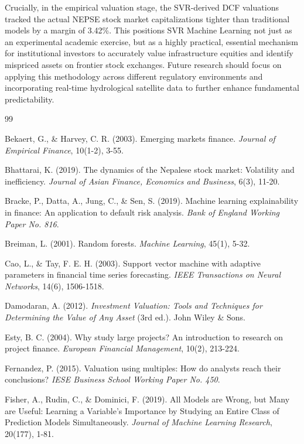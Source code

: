 \documentclass[11pt,a4paper]{article}
\begin{document}
Crucially, in the empirical valuation stage, the SVR-derived DCF valuations tracked the actual NEPSE stock market capitalizations tighter than traditional models by a margin of 3.42\%. This positions SVR Machine Learning not just as an experimental academic exercise, but as a highly practical, essential mechanism for institutional investors to accurately value infrastructure equities and identify mispriced assets on frontier stock exchanges. Future research should focus on applying this methodology across different regulatory environments and incorporating real-time hydrological satellite data to further enhance fundamental predictability.

\begin{thebibliography}{99}

Bekaert, G., \& Harvey, C. R. (2003). Emerging markets finance. \textit{Journal of Empirical Finance}, 10(1-2), 3-55.

Bhattarai, K. (2019). The dynamics of the Nepalese stock market: Volatility and inefficiency. \textit{Journal of Asian Finance, Economics and Business}, 6(3), 11-20.

Bracke, P., Datta, A., Jung, C., \& Sen, S. (2019). Machine learning explainability in finance: An application to default risk analysis. \textit{Bank of England Working Paper No. 816}.

Breiman, L. (2001). Random forests. \textit{Machine Learning}, 45(1), 5-32.

Cao, L., \& Tay, F. E. H. (2003). Support vector machine with adaptive parameters in financial time series forecasting. \textit{IEEE Transactions on Neural Networks}, 14(6), 1506-1518.

Damodaran, A. (2012). \textit{Investment Valuation: Tools and Techniques for Determining the Value of Any Asset} (3rd ed.). John Wiley \& Sons.

Esty, B. C. (2004). Why study large projects? An introduction to research on project finance. \textit{European Financial Management}, 10(2), 213-224.

Fernandez, P. (2015). Valuation using multiples: How do analysts reach their conclusions? \textit{IESE Business School Working Paper No. 450}.

Fisher, A., Rudin, C., \& Dominici, F. (2019). All Models are Wrong, but Many are Useful: Learning a Variable's Importance by Studying an Entire Class of Prediction Models Simultaneously. \textit{Journal of Machine Learning Research}, 20(177), 1-81.


\end{thebibliography}
\end{document}

